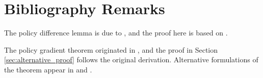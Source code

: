 








\section{Bibliography Remarks}
The policy difference lemma is due to  \cite{kakade2002approximately}, and the proof here is based on \cite{scherrer2014local}. 

The policy gradient theorem originated in \cite{SuttonMSM99}, and the proof in Section \ref{sec:alternative_proof} follows the original derivation. Alternative formulations of the theorem appear in \cite{MarbachT01,MarbachT03} and \cite{BaxterB01}.

